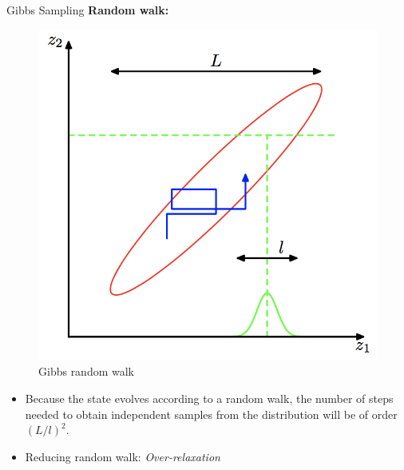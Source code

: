 \documentclass{bredelebeamer}
\begin{document}
\begin{frame}{Gibbs Sampling}
  \textbf{Random walk:}
  \begin{figure}
  \centering
  \includegraphics[scale=0.3]{gibbs_random_walk.png}
  \caption{
    Gibbs random walk
  }
  \end{figure}
  \begin{itemize}
    \item Because the state evolves according to a random walk,
    the number of steps needed to obtain independent samples
    from the distribution will be of order ${(L/l)}^2$.
    \item Reducing random walk: \textit{Over-relaxation}
  \end{itemize}
\end{frame}
\end{document}
